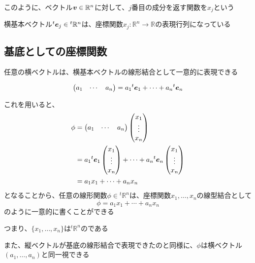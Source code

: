 \documentclass[../../../topic_linear-algebra]{subfiles}
\begin{document}
このように、ベクトル$\vb*{v} \in \mathbb{R}^n$に対して、$j$番目の成分を返す関数を$x_j$という

\br

横基本ベクトル${}^t\vb*{e}_j \in {}^t\mathbb{R}^n$は、座標関数$x_j\colon \mathbb{R}^n \to \mathbb{R}$の表現行列になっている

\subsection{基底としての座標関数}

任意の横ベクトルは、横基本ベクトルの線形結合として一意的に表現できる

\begin{equation*}
  \begin{pmatrix}
    a_1 & \cdots & a_n
  \end{pmatrix}
  = a_1 {}^t\vb*{e}_1 + \cdots + a_n {}^t\vb*{e}_n
\end{equation*}

これを用いると、
\begin{align*}
  \phi & = \begin{pmatrix}
             a_1 & \cdots & a_n
           \end{pmatrix} \begin{pmatrix}
                           x_1    \\
                           \vdots \\
                           x_n
                         \end{pmatrix}                                                \\
       & = a_1 {}^t\vb*{e}_1 \begin{pmatrix}
                               x_1    \\
                               \vdots \\
                               x_n
                             \end{pmatrix} + \cdots + a_n {}^t\vb*{e}_n \begin{pmatrix}
                                                                          x_1    \\
                                                                          \vdots \\
                                                                          x_n
                                                                        \end{pmatrix} \\
       & = a_1 x_1 + \cdots + a_n x_n
\end{align*}
となることから、任意の線形関数$\phi \in {}^t\mathbb{R}^n$は、座標関数$x_1,\dots,x_n$の線型結合として
\begin{equation*}
  \phi = a_1 x_1 + \cdots + a_n x_n
\end{equation*}
のように一意的に書くことができる

\br

つまり、$\{x_1,\dots,x_n\}$は${}^t\mathbb{R}^n$のである

\br

また、縦ベクトルが基底の線形結合で表現できたのと同様に、$\phi$は横ベクトル$(a_1,\dots,a_n)$と同一視できる
\end{document}
